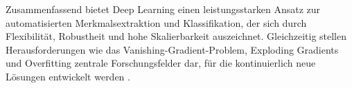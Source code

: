 Zusammenfassend bietet Deep Learning einen leistungsstarken Ansatz zur automatisierten Merkmalsextraktion und Klassifikation, der sich durch Flexibilität, Robustheit und hohe Skalierbarkeit auszeichnet. Gleichzeitig stellen Herausforderungen wie das Vanishing-Gradient-Problem, Exploding Gradients und Overfitting zentrale Forschungsfelder dar, für die kontinuierlich neue Lösungen entwickelt werden \cite{Alzubaidi2021}. 






